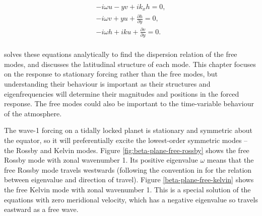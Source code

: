 \begin{equation}\label{eqn:sw-eqns-2}
  \begin{gathered}
      - i \omega u - y v + i k_{x} h = 0, \\
      - i \omega v + y u + \frac{\partial h}{\partial y} = 0, \\
      - i \omega h + i k u + \frac{\partial v}{\partial y} = 0. \\
  \end{gathered}
\end{equation}

\citet{matsuno1966quasi} solves these equations analytically to find the dispersion relation of the free modes, and discusses the latitudinal structure of each mode. This chapter focuses on the response to stationary forcing rather than the free modes, but understanding their behaviour is important as their structures and eigenfrequencies will determine their magnitudes and positions in the forced response. The free modes could also be important to the time-variable behaviour of the atmosphere.






The wave-1 forcing on a tidally locked planet is stationary and symmetric about the equator, so it will preferentially excite the lowest-order symmetric modes -- the Rossby and Kelvin modes. Figure \ref{fig:beta-plane-free-rossby} shows the free Rossby mode with zonal wavenumber 1. Its positive eigenvalue $\omega$ means that the free Rossby mode travels westwards (following the convention in \citet{matsuno1966quasi} for the relation between eigenvalue and direction of travel). Figure \ref{beta-plane-free-kelvin} shows the free Kelvin mode with zonal wavenumber 1. This is a special solution of the equations with zero meridional velocity, which has a negative eigenvalue so travels eastward as a free wave.

